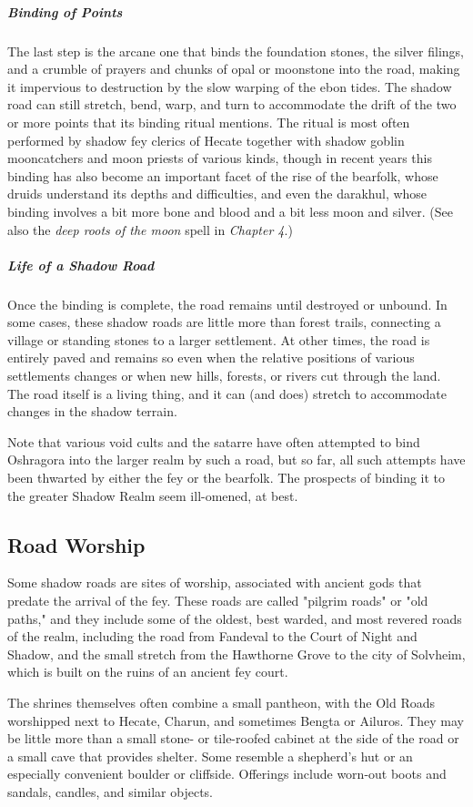 \documentclass[10pt,a4paper,twoside,bg=print,twocolumn,openany,nodeprecatedcode]{dndbook}
\begin{document}
\subparagraph{Binding of Points}
The last step is the arcane one that binds the foundation stones, the silver filings, and a crumble of prayers and chunks of opal or moonstone into the road, making it impervious to destruction by the slow warping of the ebon tides. The shadow road can still stretch, bend, warp, and turn to accommodate the drift of the two or more points that its binding ritual mentions. The ritual is most often performed by shadow fey clerics of Hecate together with shadow goblin mooncatchers and moon priests of various kinds, though in recent years this binding has also become an important facet of the rise of the bearfolk, whose druids understand its depths and difficulties, and even the darakhul, whose binding involves a bit more bone and blood and a bit less moon and silver. (See also the \textit{deep roots of the moon} spell in \textit{Chapter 4}.)

\subparagraph{Life of a Shadow Road}
Once the binding is complete, the road remains until destroyed or unbound. In some cases, these shadow roads are little more than forest trails, connecting a village or standing stones to a larger settlement. At other times, the road is entirely paved and remains so even when the relative positions of various settlements changes or when new hills, forests, or rivers cut through the land. The road itself is a living thing, and it can (and does) stretch to accommodate changes in the shadow terrain.

Note that various void cults and the satarre have often attempted to bind Oshragora into the larger realm by such a road, but so far, all such attempts have been thwarted by either the fey or the bearfolk. The prospects of binding it to the greater Shadow Realm seem ill-omened, at best.

\subsection{Road Worship}
Some shadow roads are sites of worship, associated with ancient gods that predate the arrival of the fey. These roads are called "pilgrim roads" or "old paths," and they include some of the oldest, best warded, and most revered roads of the realm, including the road from Fandeval to the Court of Night and Shadow, and the small stretch from the Hawthorne Grove to the city of Solvheim, which is built on the ruins of an ancient fey court.

The shrines themselves often combine a small pantheon, with the Old Roads worshipped next to Hecate, Charun, and sometimes Bengta or Ailuros. They may be little more than a small stone- or tile-roofed cabinet at the side of the road or a small cave that provides shelter. Some resemble a shepherd's hut or an especially convenient boulder or cliffside. Offerings include worn-out boots and sandals, candles, and similar objects.
\end{document}
